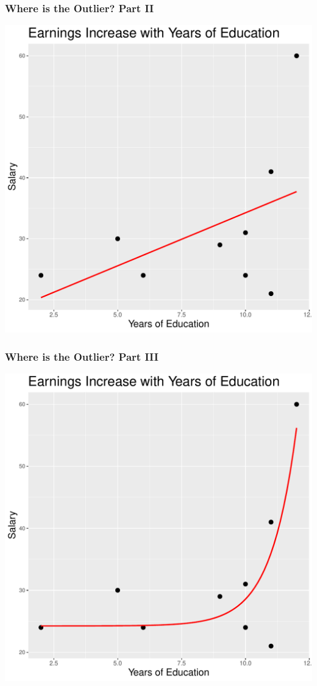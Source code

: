 \documentclass[12pt, block=fill]{beamer}
\begin{document}
\begin{frame}
  \frametitle{Where is the Outlier? Part II}
  \begin{center}
    \includegraphics[height=.95\textheight]{figures/salary_linear.pdf}
  \end{center}
\end{frame}

\begin{frame}
  \frametitle{Where is the Outlier? Part III}
  \begin{center}
    \includegraphics[height=.95\textheight]{figures/salary_exponential.pdf}
  \end{center}
\end{frame}
\end{document}
